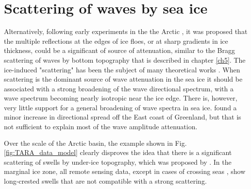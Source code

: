 \section{Scattering of waves by sea ice}
Alternatively, following early experiments in the the Arctic \citep{Wadhams&al.1986}, it was proposed that the multiple reflections at the edges of ice floes, or at sharp gradients in ice thickness, could be a significant of source of attenuation, similar to the Bragg scattering of waves by bottom topography that is described in chapter \ref{ch5}. The ice-induced "scattering" has been the subject of many theoretical works \citep{Squire2020}. When scattering is the dominant source of wave attenuation in the sea ice it should be associated with a strong broadening of the wave directional spectrum, with a wave spectrum becoming nearly isotropic near the ice edge.  There is, however, very little support for a general broadening of wave spectra in sea ice.  \cite{Sutherland&Gascard2016} found a minor increase in directional spread off the East coast of Greenland, but that is not sufficient to explain most of the wave amplitude attenuation. 

Over the scale of the Arctic basin, the example shown in Fig. \ref{fig:TARA_data_model} clearly disproves the idea that there is a significant scattering of swells by under-ice topography, which was proposed by \cite{Squire&al.2009}. In the marginal ice zone, all remote sensing data, except in cases of crossing seas \citep{Ardhuin&al.2015b}, show long-crested swells that are not compatible with a strong scattering. 

